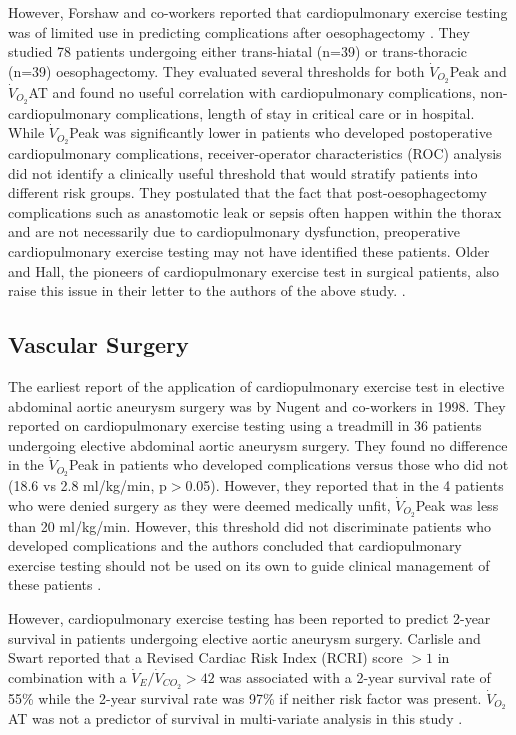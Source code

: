 However, Forshaw and co-workers reported that cardiopulmonary exercise testing was of limited use in predicting complications after oesophagectomy \parencite{forshaw_is_2008}. 
They studied 78 patients undergoing either trans-hiatal (n=39) or trans-thoracic (n=39) oesophagectomy. 
They evaluated several thresholds for both $\dot{V}_{O_2}$Peak and $\dot{V}_{O_2}$AT and found no useful correlation with cardiopulmonary complications, non-cardiopulmonary complications, length of stay in critical care or in hospital. 
While $\dot{V}_{O_2}$Peak was significantly lower in patients who developed postoperative cardiopulmonary complications, receiver-operator characteristics (ROC) analysis did not identify a clinically useful threshold that would stratify patients into different risk groups. 
They postulated that the fact that post-oesophagectomy complications such as anastomotic leak or sepsis often happen within the thorax and are not necessarily due to cardiopulmonary dysfunction, preoperative cardiopulmonary exercise testing may not have identified these patients. 
Older and Hall, the pioneers of cardiopulmonary exercise test in surgical patients, also raise this issue in their letter to the authors of the above study. \parencite{hall_cardiopulmonary_2009}. 

\subsection{Vascular Surgery}
The earliest report of the application of cardiopulmonary exercise test in elective abdominal aortic aneurysm surgery was by Nugent and co-workers in 1998. 
They reported on cardiopulmonary exercise testing using a treadmill in 36 patients undergoing elective abdominal aortic aneurysm surgery. 
They found no difference in the $\dot{V}_{O_2}$Peak in patients who developed complications versus those who did not (18.6 vs 2.8 ml/kg/min, p$>$0.05). 
However, they reported that in the 4 patients who were denied surgery as they were deemed medically unfit, $\dot{V}_{O_2}$Peak was less than 20 ml/kg/min. 
However, this threshold did not discriminate patients who developed complications and the authors concluded that cardiopulmonary exercise testing should not be used on its own to guide clinical management of these patients \parencite{nugent_cardiopulmonary_1998}. 

However, cardiopulmonary exercise testing has been reported to predict 2-year survival in patients undergoing elective aortic aneurysm surgery. 
Carlisle and Swart reported that a Revised Cardiac Risk Index (RCRI) score $>1$ in combination with a $\dot{V}_E/\dot{V}_{CO_2}>42$ was associated with a 2-year survival rate of 55\% while the 2-year survival rate was 97\% if neither risk factor was present. $\dot{V}_{O_2}$AT was not a predictor of survival in multi-variate analysis in this study \parencite{carlisle_mid-term_2007}. 

